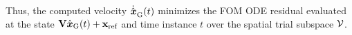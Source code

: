 \documentclass[3p,computermodern,10pt]{elsarticle}
\begin{document}
Thus, the computed velocity $\dot{\hat{ \boldsymbol x}}_{\text{G}}^{}(t)$ minimizes the
FOM ODE residual evaluated at the state $\mathbf {V}
\hat{ \boldsymbol x}_{\text{G}}(t) + \mathbf{x}_\text{ref}$ and time instance $t$ over the spatial trial
subspace $\mathcal{V }$.
\end{document}
